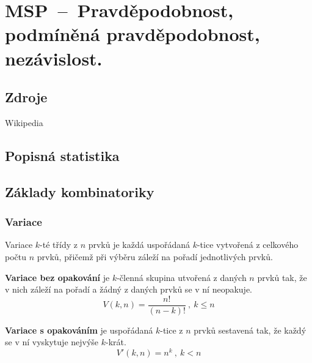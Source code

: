 

\graphicspath{{msp/pravdepodobnost/figures}}


\chapter{MSP~--~Pravděpodobnost, podmíněná pravděpodobnost, nezávislost.}


\section{Zdroje}

\begin{compactitem}
    \item {}
    \item {}
    \item Wikipedia
\end{compactitem}


\section{Popisná statistika}



\section{Základy kombinatoriky}

\subsection{Variace}

\begin{compactitem}
    \item Variace $k$-té třídy z $n$ prvků je každá uspořádaná $k$-tice vytvořená z celkového počtu $n$ prvků, přičemž při výběru záleží na pořadí jednotlivých prvků.

    \item \textbf{Variace bez opakování} je $k$-členná skupina utvořená z daných $n$ prvků tak, že v nich záleží na pořadí a žádný z daných prvků se v ní neopakuje.
    $$ V(k, n) = \frac{n!}{(n-k)!} ~,~ k \leq n $$

    \item \textbf{Variace s opakováním} je uspořádaná $k$-tice z $n$ prvků sestavená tak, že každý se v ní vyskytuje nejvýše $k$-krát.
    $$ V'(k, n) = n^k ~,~ k < n $$
\end{compactitem}

